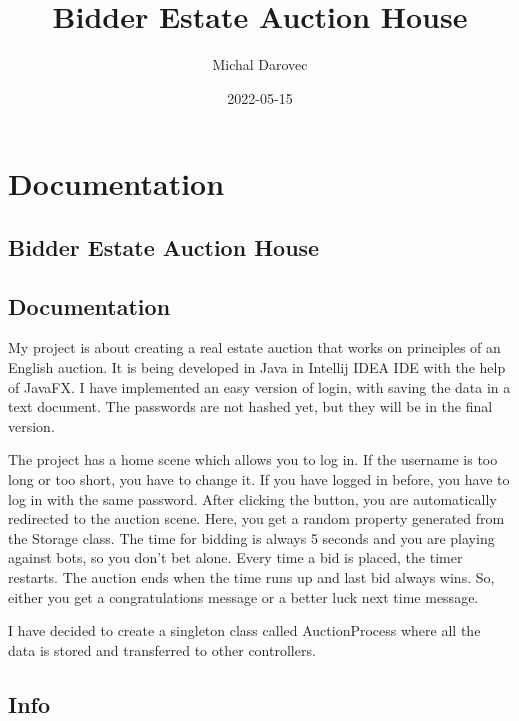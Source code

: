 \documentclass[
]{report}
\title{Bidder Estate Auction House}
\author{Michal Darovec}
\date{2022-05-15}
\begin{document}
\maketitle

{
\setcounter{tocdepth}{1}
\tableofcontents
}
\hypertarget{documentation}{%
\chapter{Documentation}\label{documentation}}

\hypertarget{bidder-estate-auction-house}{%
\section{Bidder Estate Auction House}\label{bidder-estate-auction-house}}

\hypertarget{documentation-1}{%
\section{Documentation}\label{documentation-1}}

My project is about creating a real estate auction that works on principles of an English auction. It is being developed in Java in Intellij IDEA IDE with the help of JavaFX. I have implemented an easy version of login, with saving the data in a text document. The passwords are not hashed yet, but they will be in the final version.

The project has a home scene which allows you to log in. If the username is too long or too short, you have to change it. If you have logged in before, you have to log in with the same password. After clicking the button, you are automatically redirected to the auction scene. Here, you get a random property generated from the Storage class. The time for bidding is always 5 seconds and you are playing against bots, so you don't bet alone. Every time a bid is placed, the timer restarts. The auction ends when the time runs up and last bid always wins. So, either you get a congratulations message or a better luck next time message.

I have decided to create a singleton class called AuctionProcess where all the data is stored and transferred to other controllers.

\hypertarget{info}{%
\section{Info}\label{info}}
\end{document}
